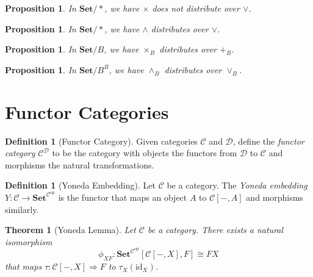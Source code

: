 \documentclass{book}
\newtheorem{prop}[ax]{Proposition}
\newtheorem{thm}[ax]{Theorem}
\theoremstyle{definition}
\newtheorem{df}[ax]{Definition}
\newcommand{\id}[1]{\ensuremath{\mathrm{id}_{#1}}}
\newcommand{\Set}{\ensuremath{\mathbf{Set}}}
\newcommand{\op}[1]{\ensuremath{{#1}^{\mathrm{op}}}}
\begin{document}
\begin{prop}
In $\Set / *$, we have $\times$ does not distribute over $\vee$.
\end{prop}

\begin{prop}
In $\Set / *$, we have $\wedge$ distributes over $\vee$.
\end{prop}

\begin{prop}
In $\Set/ B$, we have $\times_B$ distributes over $+_B$.
\end{prop}

\begin{prop}
In $\Set / B^B$, we have $\wedge_B$ distributes over $\vee_B$.
\end{prop}

\section{Functor Categories}

\begin{df}[Functor Category]
Given categories $\mathcal{C}$ and $\mathcal{D}$, define the \emph{functor category} $\mathcal{C}^\mathcal{D}$ to be the category with objects the functors from $\mathcal{D}$ to $\mathcal{C}$ and morphisms the natural transformations.
\end{df}

\begin{df}[Yoneda Embedding]
Let $\mathcal{C}$ be a category. The \emph{Yoneda embedding} $Y : \mathcal{C} \rightarrow \Set^{\op{\mathcal{C}}}$ is the functor that maps an object $A$ to $\mathcal{C}[-,A]$ and morphisms similarly.
\end{df}

\begin{thm}[Yoneda Lemma]
Let $\mathcal{C}$ be a category. There exists a natural isomorphism
\[ \phi_{XF} : \Set^{\op{\mathcal{C}}}[\mathcal{C}[-,X],F] \cong FX \]
that maps $\tau : \mathcal{C}[-,X] \Rightarrow F$ to $\tau_X(\id{X})$.
\end{thm}
\end{document}
